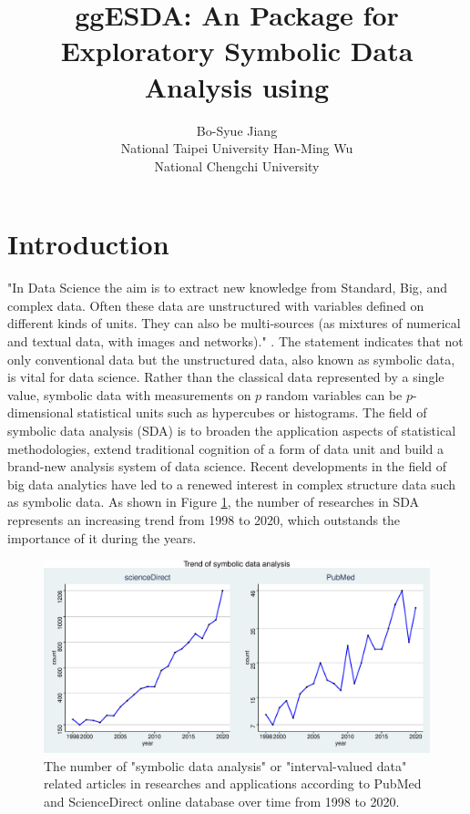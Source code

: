 \documentclass[article]{jss}
\author{Bo-Syue Jiang\\National Taipei University
\And Han-Ming Wu\\National Chengchi University}
\title{ggESDA: An \proglang{R} Package for Exploratory Symbolic Data Analysis using \pkg{ggplot2}}
\newcommand{\imgdir}{../../../paperImage/}
\begin{document}
\section{Introduction}
"In Data Science the aim is to extract new knowledge from Standard, Big, and complex data. Often these data are unstructured with variables defined on different kinds of units. They can also be multi-sources (as mixtures of numerical and textual data, with images and networks)." \cite{Diday:2018}. The statement indicates that not only conventional data but the unstructured data, also known as symbolic data, is vital for data science. Rather than the classical data represented by a single value, symbolic data with measurements on $p$ random variables can be $p$-dimensional statistical units such as hypercubes or histograms. The field of symbolic data analysis (SDA) \cite{Billard+Diday:2007} is to broaden the application aspects of statistical methodologies, extend traditional cognition of a form of data unit and build a brand-new analysis system of data science. Recent developments in the field of big data analytics have led to a renewed interest in complex structure data such as symbolic data. As shown in Figure \ref{fig:trend}, the number of researches in SDA represents an increasing trend from 1998 to 2020, which outstands the importance of it during the years.



\begin{figure}[htbp]	
  		\centering	 			 	 
\includegraphics{ggESDA_Jiang&Wu_20210915-TrendFig}
  		\caption{The number of "symbolic data analysis" or "interval-valued data" related articles in researches and applications according to PubMed and ScienceDirect online database over time from 1998 to 2020.}   		
  		\label{fig:trend}   			 		 
\end{figure}
\end{document}
